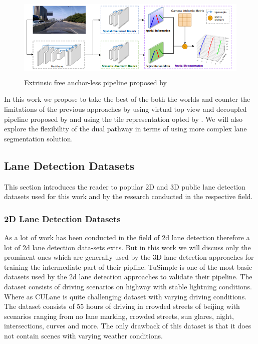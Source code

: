 \begin{figure}[h]
    \centering
\includegraphics[width=12cm, height=4cm]{images/once_pipeline.png}
    \caption{Extrinsic free anchor-less pipeline proposed by \cite{yan2022once}}
    \end{figure}

In this work we propose to take the best of the both the worlds and counter the limitations of the previous approaches by using virtual top view and decoupled pipeline proposed by \cite{guo2020gen} and using the tile representation opted by \cite{DBLP:journals/corr/abs-2011-01535}. We will also explore the flexibility of the dual pathway in terms of using more complex lane segmentation solution.

\subsection{Lane Detection Datasets}
This section introduces the reader to popular 2D and 3D public lane detection datasets used for this work and by the research conducted in the respective field. 

\subsubsection{2D Lane Detection Datasets}
As a lot of work has been conducted in the field of 2d lane detection therefore a lot of 2d lane detection data-sets exits. But in this work we will discuss only the prominent ones which are generally used by the 3D lane detection approaches for training the intermediate part of their pipline. \cite{Tusimple} TuSimple is one of the most basic datasets used by the 2d lane detection approaches to validate their pipeline. The dataset consists of driving scenarios on highway with stable lightning conditions. Where as CULane \cite{pan2018SCNN} is quite challenging dataset with varying driving conditions. The dataset consists of 55 hours of driving in crowded streets of beijing with scenarios ranging from no lane marking, crowded streets, sun glares, night, intersections, curves and more. The only drawback of this dataset is that it does not contain scenes with varying weather conditions.

